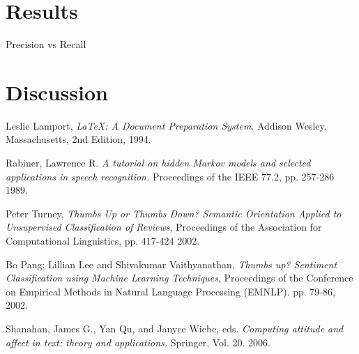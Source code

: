 \documentclass[a4paper,12pt,twoside]{ltxdoc}
\begin{document}
\section{Results}

Precision vs Recall

\section{Discussion}


\newpage 

\begin{thebibliography}{9}

  Leslie Lamport,
  \emph{\LaTeX: A Document Preparation System}.
  Addison Wesley, Massachusetts,
  2nd Edition,
  1994.

Rabiner, Lawrence R.
\emph{A tutorial on hidden Markov models and selected applications in speech recognition.}
Proceedings of the IEEE 77.2,
pp. 257-286
1989.

Peter Turney, 
\emph{Thumbs Up or Thumbs Down? Semantic Orientation Applied to Unsupervised Classification of Reviews},
 Proceedings of the Association for Computational Linguistics,
 pp. 417-424
 2002.

  Bo Pang; Lillian Lee and Shivakumar Vaithyanathan,
  \emph{Thumbs up? Sentiment Classification using Machine Learning Techniques},
  Proceedings of the Conference on Empirical Methods in Natural Language Processing (EMNLP).
  pp. 79-86,
  2002.

  Shanahan, James G., Yan Qu, and Janyce Wiebe, eds.
  \emph{Computing attitude and affect in text: theory and applications.}
  Springer, 
  Vol. 20.
  2006.

\end{thebibliography}
\end{document}
